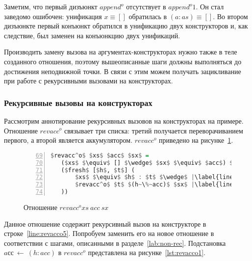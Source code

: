Заметим, что первый дизъюнкт $append^o$ отсутствует в $append^o1$.
Он стал заведомо ошибочен: унификация $x \equiv []$ обратилась в $(a:as) \equiv []$.
Во втором дизъюнкте первый конъюнкт обратился в унификацию двух конструкторов и, как следствие, был заменен на конъюнкцию двух унификаций.

Производить замену вызова на аргументах-конструкторах нужно также в теле созданного отношения, поэтому вышеописанные шаги должны выполняться до достижения неподвижной точки.
В связи с этим можем получать зацикливание при работе с рекурсивными вызовами на конструкторах.


\subsubsection{Рекурсивные вызовы на конструкторах}
\label{lab:rec}

Рассмотрим аннотирование рекурсивных вызовов на конструкторах на примере.
Отношение $revacc^o$ связывает три списка: третий получается переворачиванием первого, а второй является аккумулятором.
$revacc^o$ приведено на рисунке~\ref{lst:revacco}.

\begin{figure}[h!]
  \begin{center}
  \begin{minipage}{0.53\textwidth}
  \begin{lstlisting}[language=Haskell, frame=single, numbers=left,numberstyle=\small, firstnumber=69, escapechar=|]
 $revacc^o$ $xs$ $acc$ $sx$ =
   ($xs$ $\equiv$ [] $\wedge$ $sx$ $\equiv$ $acc$) $\vee$ |\label{line:revacco2}|
   ($fresh$ [$h$, $t$] (
       $xs$ $\equiv$ $h$ : $t$ $\wedge$ |\label{line:revacco4}|
       $revacc^o$ $t$ $(h~\%~acc)$ $sx$ |\label{line:revacco5}|
   ))
    \end{lstlisting}
  \end{minipage}
  \end{center}
  \caption{Отношение $revacc^o xs \ acc \ sx$}
  \label{lst:revacco}
\end{figure}

Данное отношение содержит рекурсивный вызов на конструкторе в строке~\ref{line:revacco5}.
Попробуем заменить его на новое отношение в соответствии с шагами, описанными в разделе~\ref{lab:non-rec}.
Подстановка $aсс~\gets~(h:acc)$ в $revacc^o$ представлена на рисунке~\ref{lst:revacco1}.


